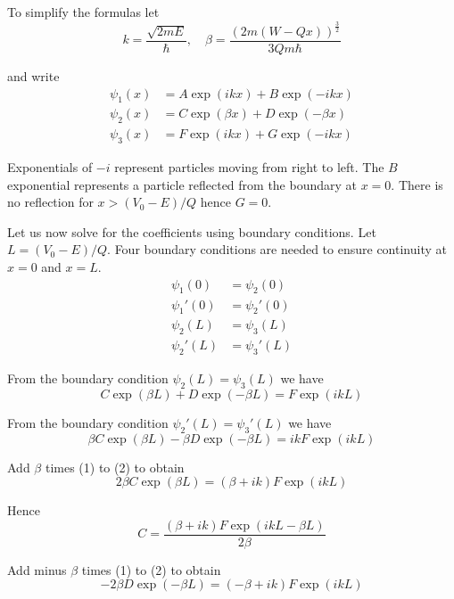 To simplify the formulas let
\begin{equation*}
k=\frac{\sqrt{2mE}}{\hbar},\quad\beta=\frac{(2m(W-Qx))^\frac{3}{2}}{3Qm\hbar}
\end{equation*}

and write
\begin{align*}
\psi_1(x)&=A\exp(ikx)+B\exp(-ikx)
\\
\psi_2(x)&=C\exp(\beta x)+D\exp(-\beta x)
\\
\psi_3(x)&=F\exp(ikx)+G\exp(-ikx)
\end{align*}

Exponentials of $-i$ represent particles moving from right to left.
The $B$ exponential represents a particle reflected from the
boundary at $x=0$.
There is no reflection for $x>(V_0-E)/Q$ hence $G=0$.

\bigskip
Let us now solve for the coefficients using boundary conditions.
Let $L=(V_0-E)/Q$.
Four boundary conditions are needed to ensure continuity
at $x=0$ and $x=L$.
\begin{align*}
\psi_1(0)&=\psi_2(0)
\\
\psi_1'(0)&=\psi_2'(0)
\\
\psi_2(L)&=\psi_3(L)
\\
\psi_2'(L)&=\psi_3'(L)
\end{align*}

From the boundary condition $\psi_2(L)=\psi_3(L)$ we have
\begin{equation*}
C\exp(\beta L)+D\exp(-\beta L)=F\exp(ikL)
\tag{1}
\end{equation*}

From the boundary condition $\psi_2'(L)=\psi_3'(L)$ we have
\begin{equation*}
\beta C\exp(\beta L)-\beta D\exp(-\beta L)
=ikF\exp(ikL)
\tag{2}
\end{equation*}

Add $\beta$ times (1) to (2) to obtain
\begin{equation*}
2\beta C\exp(\beta L)=(\beta+ik)F\exp(ikL)
\end{equation*}

Hence
\begin{equation*}
C=\frac{(\beta+ik)F\exp(ikL-\beta L)}{2\beta}
\tag{3}
\end{equation*}

Add minus $\beta$ times (1) to (2) to obtain
\begin{equation*}
-2\beta D\exp(-\beta L)=(-\beta+ik)F\exp(ikL)
\end{equation*}


